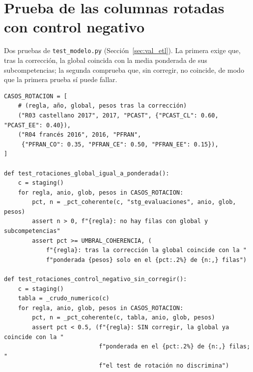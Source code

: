 \documentclass[12pt, a4paper, oneside]{report}
\begin{document}
\section{Prueba de las columnas rotadas con control negativo}
Dos pruebas de \texttt{test\_modelo.py} (Sección~\ref{sec:val_etl}). La primera exige que, tras la corrección, la global coincida con la media ponderada de sus subcompetencias; la segunda comprueba que, sin corregir, no coincide, de modo que la primera prueba sí puede fallar.

\begingroup\footnotesize{}
\begin{verbatim}
CASOS_ROTACION = [
    # (regla, año, global, pesos tras la corrección)
    ("R03 castellano 2017", 2017, "PCAST", {"PCAST_CL": 0.60, "PCAST_EE": 0.40}),
    ("R04 francés 2016", 2016, "PFRAN",
     {"PFRAN_CO": 0.35, "PFRAN_CE": 0.50, "PFRAN_EE": 0.15}),
]

def test_rotaciones_global_igual_a_ponderada():
    c = staging()
    for regla, anio, glob, pesos in CASOS_ROTACION:
        pct, n = _pct_coherente(c, "stg_evaluaciones", anio, glob, pesos)
        assert n > 0, f"{regla}: no hay filas con global y subcompetencias"
        assert pct >= UMBRAL_COHERENCIA, (
            f"{regla}: tras la corrección la global coincide con la "
            f"ponderada {pesos} solo en el {pct:.2%} de {n:,} filas")

def test_rotaciones_control_negativo_sin_corregir():
    c = staging()
    tabla = _crudo_numerico(c)
    for regla, anio, glob, pesos in CASOS_ROTACION:
        pct, n = _pct_coherente(c, tabla, anio, glob, pesos)
        assert pct < 0.5, (f"{regla}: SIN corregir, la global ya coincide con la "
                           f"ponderada en el {pct:.2%} de {n:,} filas; "
                           f"el test de rotación no discrimina")
\end{verbatim}
\endgroup
\end{document}
